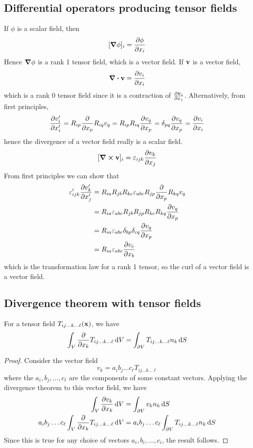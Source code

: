 \subsection{Differential operators producing tensor fields}
If \(\phi\) is a scalar field, then
\[
	[\grad\phi]_i = \pdv{\phi}{x_i}
\]
Hence \(\grad\phi\) is a rank 1 tensor field, which is a vector field.
If \(\vb v\) is a vector field,
\[
	\div \vb v = \pdv{v_i}{x_i}
\]
which is a rank 0 tensor field since it is a contraction of \(\pdv{\vb v_i}{x_j}\).
Alternatively, from first principles,
\[
	\pdv{v_i'}{x_i'} = R_{ip}\pdv{x_p}R_{iq}v_q = R_{ip}R_{iq}\pdv{v_q}{x_p} = \delta_{pq}\pdv{v_q}{x_p} = \pdv{v_i}{x_i}
\]
hence the divergence of a vector field really is a scalar field.
\[
	[\curl \vb v]_i = \varepsilon_{ijk} \pdv{v_k}{x_j}
\]
From first principles we can show that
\begin{align*}
	\varepsilon_{ijk}' \pdv{v_k'}{x_j'} & = R_{ia}R_{jb}R_{kc}\varepsilon_{abc} R_{jp}\pdv{x_p} R_{kq}v_q       \\
	                                    & = R_{ia} \varepsilon_{abc} R_{jb} R_{jp} R_{kc} R_{kq} \pdv{v_q}{x_p} \\
	                                    & = R_{ia} \varepsilon_{abc} \delta_{bp} \delta_{cq} \pdv{v_q}{x_p}     \\
	                                    & = R_{ia} \varepsilon_{abc} \pdv{v_c}{x_b}
\end{align*}
which is the transformation law for a rank 1 tensor, so the curl of a vector field is a vector field.

\subsection{Divergence theorem with tensor fields}
\begin{proposition}
	For a tensor field \(T_{ij\dots k \dots \ell}(\vb x)\), we have
	\[
		\int_V \pdv{x_k} T_{ij\dots k \dots \ell} \dd{V} = \int_{\partial V} T_{ij\dots k \dots \ell} n_k \dd{S}
	\]
\end{proposition}
\begin{proof}
	Consider the vector field
	\[
		v_k = a_i b_j \dots c_\ell T_{ij\dots k \dots \ell}
	\]
	where the \(a_i, b_j, \dots, c_\ell\) are the components of some constant vectors.
	Applying the divergence theorem to this vector field, we have
	\begin{align*}
		\int_V \pdv{v_k}{x_k} \dd{V}                                         & = \int_{\partial V} v_k n_k \dd{S}                                          \\
		a_i b_j \dots c_\ell \int_V \pdv{x_k} T_{ij\dots k\dots \ell} \dd{V} & = a_i b_j \dots c_\ell \int_{\partial V} T_{ij\dots k\dots \ell} n_k \dd{S}
	\end{align*}
	Since this is true for any choice of vectors \(a_i, b_i, \dots, c_i\), the result follows.
\end{proof}
